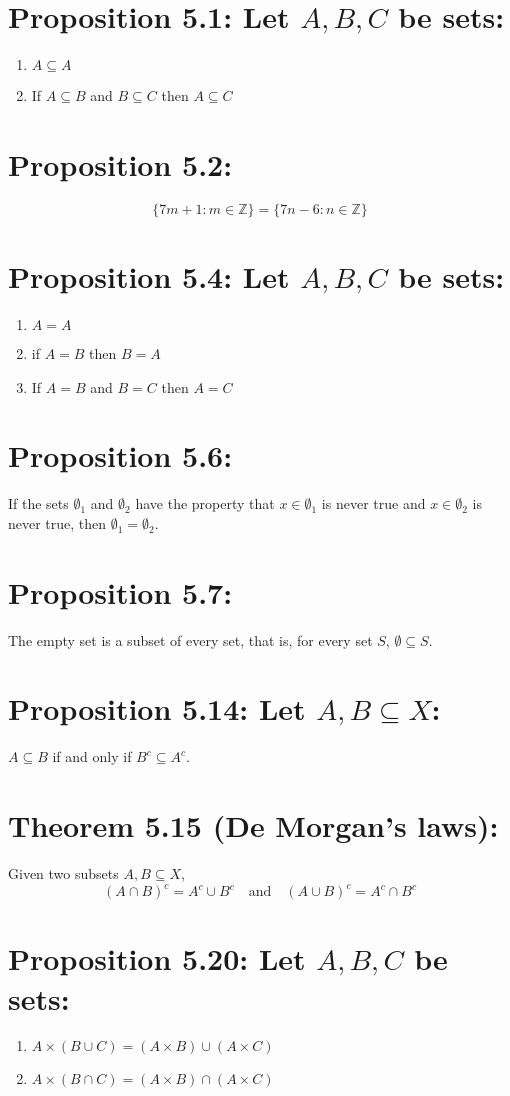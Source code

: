 
\section*{Proposition 5.1: Let $A,B,C$ be sets:}
\begin{enumerate}
    \item $A \subseteq A$
    \item If $A \subseteq B$ and $B \subseteq C$ then $A \subseteq C$
\end{enumerate}

\section*{Proposition 5.2:}
\[ \{7m+1 : m \in \mathbb{Z}\} = \{7n-6 : n \in \mathbb{Z}\} \]

\section*{Proposition 5.4: Let $A,B,C$ be sets:}
\begin{enumerate}
    \item $A = A$
    \item if $A = B$ then $B = A$
    \item If $A = B$ and $B = C$ then $A = C$
\end{enumerate}

\section*{Proposition 5.6:}
If the sets $\emptyset_1$ and $\emptyset_2$ have the property that $x \in \emptyset_1$ is never true and $x \in \emptyset_2$ is never true, then $\emptyset_1 = \emptyset_2$.

\section*{Proposition 5.7:}
The empty set is a subset of every set, that is, for every set $S$, $\emptyset \subseteq S$.

\section*{Proposition 5.14: Let $A,B \subseteq X$:}
$A \subseteq B$ if and only if $B^c \subseteq A^c$.

\section*{Theorem 5.15 (De Morgan’s laws):}
Given two subsets $A,B \subseteq X$,
\[ (A \cap B)^c = A^c \cup B^c \quad \text{and} \quad (A \cup B)^c = A^c \cap B^c \]

\section*{Proposition 5.20: Let $A,B,C$ be sets:}
\begin{enumerate}
    \item $A \times (B \cup C) = (A \times B) \cup (A \times C)$
    \item $A \times (B \cap C) = (A \times B) \cap (A \times C)$
\end{enumerate}
